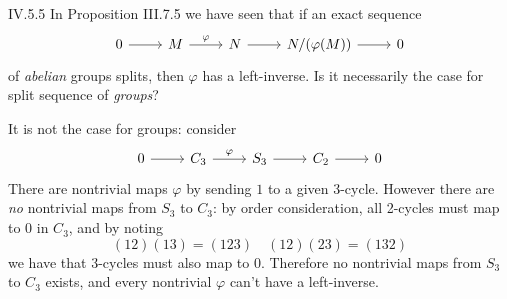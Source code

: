 \begin{problem}{IV.5.5}
In Proposition III.7.5 we have seen that if an exact sequence
\[
\begin{tikzcd}
0 \arrow[r] &M \arrow[r, "\varphi"] &N \arrow[r] &N/(\varphi(M)) \arrow[r] &0
\end{tikzcd}	
\]
of \emph{abelian} groups splits, then $\varphi$ has a left-inverse. Is it necessarily the case for split sequence of \emph{groups}?
\end{problem}
\begin{sol}
It is not the case for groups: consider
\[
\begin{tikzcd}
0 \arrow[r] &C_3 \arrow[r, "\varphi"] &S_3 \arrow[r] &C_2 \arrow[r] &0
\end{tikzcd}
\]
There are nontrivial maps $\varphi$ by sending $1$ to a given 3-cycle. However there are \emph{no} nontrivial maps from $S_3$ to $C_3$: by order consideration, all 2-cycles must map to $0$ in $C_3$, and by noting
\[
(12)(13) = (1 2 3) \quad (1 2)(2 3) = (1 3 2)
\]
we have that 3-cycles must also map to $0$. Therefore no nontrivial maps from $S_3$ to $C_3$ exists, and every nontrivial $\varphi$ can't have a left-inverse. 
\end{sol}